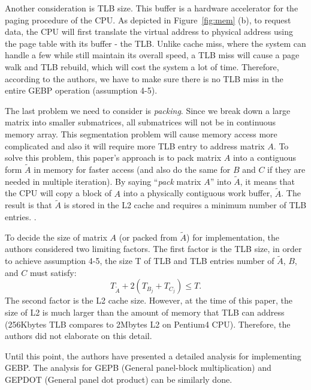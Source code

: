 \documentclass[a4paper,12pt]{article}
\begin{document}
Another consideration is TLB size. This buffer is a hardware accelerator for the paging procedure of the CPU. As depicted in Figure~\ref{fig:mem} (b), to request data, the CPU will first translate the virtual address to physical address using the page table with its buffer - the TLB. Unlike cache miss, where the system can handle a few while still maintain its overall speed, a TLB miss will cause a page walk and TLB rebuild, which will cost the system a lot of time. Therefore, according to the authors, we have to make sure there is no TLB miss in the entire GEBP operation (assumption 4-5).

The last problem we need to consider is \emph{packing}. Since we break down a large matrix into smaller submatrices, all submatrices will not be in continuous memory array. This segmentation problem will cause memory access more complicated and also it will require more TLB entry to address matrix $A$. To solve this problem, this paper's approach is to pack matrix $A$ into a contiguous form $\tilde{A}$ in memory for faster access (and also do the same for $B$ and $C$ if they are needed in multiple iteration). By saying ``\emph{pack} matrix $A$'' into $\tilde{A}$, it means that the CPU will copy a block of $A$ into a physically contiguous work buffer, $\tilde{A}$. The result is that $\tilde{A}$ is stored in the L2 cache and requires a minimum number of TLB entries. \cite{goto2008}.

To decide the size of matrix $A$ (or packed from $\tilde{A}$) for implementation, the authors considered two limiting factors. The first factor is the TLB size, in order to achieve assumption 4-5, the size T of TLB and TLB entries number of $\tilde{A}$, $B$, and $C$ must satisfy:
$$
T_{\tilde{A}} + 2 (T_{B_j} + T_{C_j}) \le T.
$$
\noindent
The second factor is the L2 cache size. However, at the time of this paper, the size of L2 is much larger than the amount of memory that TLB can address (256Kbytes TLB compares to 2Mbytes L2 on Pentium4 CPU). Therefore, the authors did not elaborate on this detail.

Until this point, the authors have presented a detailed analysis for implementing GEBP. The analysis for GEPB (General panel-block multiplication) and GEPDOT (General panel dot product) can be similarly done.
\end{document}
